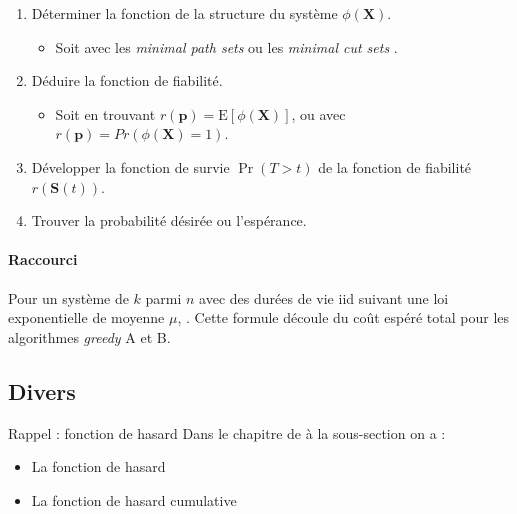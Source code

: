 \documentclass[french]{article}
\begin{document}
\begin{multicols*}{2}
\begin{definitionNOHFILLpropos}
\begin{enumerate}[label	=	\circled{\arabic*}{trueblue}]
	\item	Déterminer la fonction de la structure du système $\phi(\bm{X})$.
		\begin{itemize}
		\item	Soit avec les \og \textit{minimal path sets} \fg{} ou les \og \textit{minimal cut sets} \fg{}.
		\end{itemize}
	\item	Déduire la fonction de fiabilité.
		\begin{itemize}
		\item	Soit en trouvant $r(\bm{p}) = \text{E}[\phi(\bm{X})]$, ou avec $r(\bm{p}) = Pr(\phi(\bm{X}) = 1)$.
		\end{itemize}
	\item	Développer la fonction de survie $\Pr(T > t)$ de la fonction de fiabilité $r(\bm{S}(t))$.
	\item	Trouver la probabilité désirée ou l'espérance.
\end{enumerate}
\end{definitionNOHFILLpropos}

\paragraph{Raccourci}	Pour un système de $k$ parmi $n$ avec des durées de vie iid suivant une loi exponentielle de moyenne $\mu$, . Cette formule découle du coût espéré total pour les algorithmes \og \textit{greedy} \fg{} A et B.


\columnbreak
\subsection{Divers}
\label{subsec:reliabilityVaria}
\begin{rappel}{Rappel : fonction de hasard}
Dans le chapitre de \textit{\underline{}} à la sous-section \textit{\underline{}} on a : 
\begin{itemize}
	\item	La fonction de hasard 
	\item	La fonction de hasard cumulative 
\end{itemize}
\end{rappel}


\end{multicols*}
\end{document}
